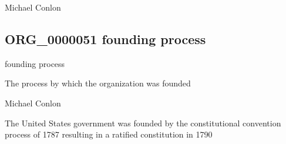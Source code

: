 \documentclass[letterpaper,10pt,english]{sphinxmanual}
\begin{document}
\begin{sphinxShadowBox}

\sphinxAtStartPar
Michael Conlon 
\end{sphinxShadowBox}
\begin{quote}

\ignorespaces \end{quote}


\subsection{ORG\_0000051 \sphinxhyphen{} founding process}
\label{\detokenize{doc-ORG_0000051:org-0000051-founding-process}}\label{\detokenize{doc-ORG_0000051:index-0}}\label{\detokenize{doc-ORG_0000051::doc}}
\begin{sphinxShadowBox}

\sphinxAtStartPar
founding process
\end{sphinxShadowBox}

\begin{sphinxShadowBox}

\sphinxAtStartPar
{\hyperref[\detokenize{doc-BFO_0000015::doc}]{}}
\end{sphinxShadowBox}

\begin{sphinxShadowBox}

\sphinxAtStartPar
The process by which the organization was founded
\end{sphinxShadowBox}

\begin{sphinxShadowBox}

\sphinxAtStartPar
Michael Conlon 
\end{sphinxShadowBox}

\begin{sphinxShadowBox}

\sphinxAtStartPar
The United States government was founded by the constitutional convention process of 1787 resulting in a ratified constitution in 1790
\end{sphinxShadowBox}
\end{document}
